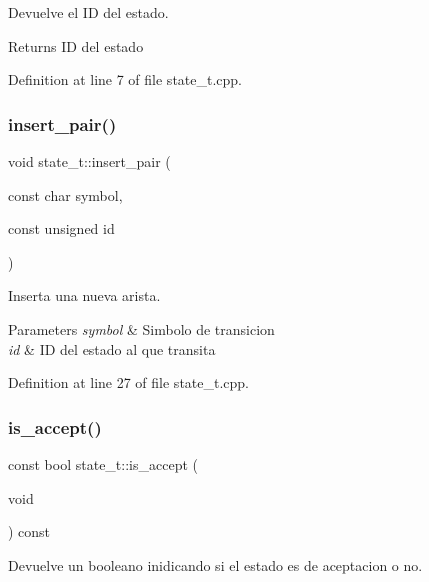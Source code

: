 Devuelve el ID del estado. 

\begin{DoxyReturn}{Returns}
ID del estado 
\end{DoxyReturn}


Definition at line 7 of file state\+\_\+t.\+cpp.

\mbox{\label{classstate__t_a8a18ea542fd131b22dfee5897caab79e}} 
\subsubsection{\texorpdfstring{insert\+\_\+pair()}{insert\_pair()}}
{\footnotesize\ttfamily void state\+\_\+t\+::insert\+\_\+pair (\begin{DoxyParamCaption}\item[{const char}]{symbol,  }\item[{const unsigned}]{id }\end{DoxyParamCaption})}



Inserta una nueva arista. 


\begin{DoxyParams}{Parameters}
{\em symbol} & Simbolo de transicion \\
\hline
{\em id} & ID del estado al que transita \\
\hline
\end{DoxyParams}


Definition at line 27 of file state\+\_\+t.\+cpp.

\mbox{\label{classstate__t_a83874dc98292ca29be83680dee6f9456}} 
\subsubsection{\texorpdfstring{is\+\_\+accept()}{is\_accept()}}
{\footnotesize\ttfamily const bool state\+\_\+t\+::is\+\_\+accept (\begin{DoxyParamCaption}\item[{void}]{ }\end{DoxyParamCaption}) const}



Devuelve un booleano inidicando si el estado es de aceptacion o no. 

